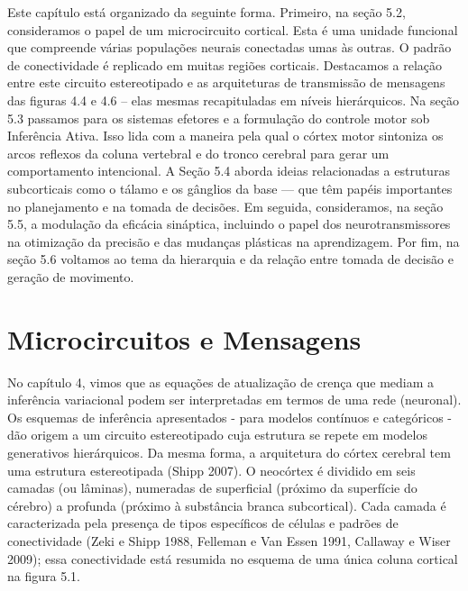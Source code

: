 \documentclass[
  12pt,
]{book}
\begin{document}
Este capítulo está organizado da seguinte forma. Primeiro, na seção 5.2, consideramos o papel de um microcircuito cortical. Esta é uma unidade funcional que compreende várias populações neurais conectadas umas às outras. O padrão de conectividade é replicado em muitas regiões corticais. Destacamos a relação entre este circuito estereotipado e as arquiteturas de transmissão de mensagens das figuras 4.4 e 4.6 -- elas mesmas recapituladas em níveis hierárquicos. Na seção 5.3 passamos para os sistemas efetores e a formulação do controle motor sob Inferência Ativa. Isso lida com a maneira pela qual o córtex motor sintoniza os arcos reflexos da coluna vertebral e do tronco cerebral para gerar um comportamento intencional. A Seção 5.4 aborda ideias relacionadas a estruturas subcorticais como o tálamo e os gânglios da base --- que têm papéis importantes no planejamento e na tomada de decisões. Em seguida, consideramos, na seção 5.5, a modulação da eficácia sináptica, incluindo o papel dos neurotransmissores na otimização da precisão e das mudanças plásticas na aprendizagem. Por fim, na seção 5.6 voltamos ao tema da hierarquia e da relação entre tomada de decisão e geração de movimento.

\hypertarget{microcircuitos-e-mensagens}{%
\section{Microcircuitos e Mensagens}\label{microcircuitos-e-mensagens}}

No capítulo 4, vimos que as equações de atualização de crença que mediam a inferência variacional podem ser interpretadas em termos de uma rede (neuronal). Os esquemas de inferência apresentados - para modelos contínuos e categóricos - dão origem a um circuito estereotipado cuja estrutura se repete em modelos generativos hierárquicos. Da mesma forma, a arquitetura do córtex cerebral tem uma estrutura estereotipada (Shipp 2007). O neocórtex é dividido em seis camadas (ou lâminas), numeradas de superficial (próximo da superfície do cérebro) a profunda (próximo à substância branca subcortical). Cada camada é caracterizada pela presença de tipos específicos de células e padrões de conectividade (Zeki e Shipp 1988, Felleman e Van Essen 1991, Callaway e Wiser 2009); essa conectividade está resumida no esquema de uma única coluna cortical na figura 5.1.
\end{document}
